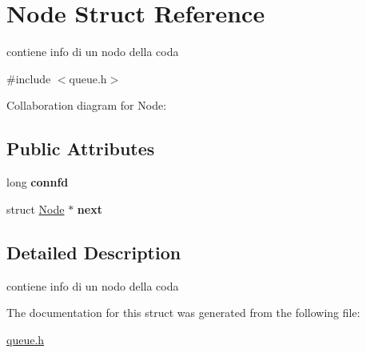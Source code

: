 \hypertarget{structNode}{}\section{Node Struct Reference}
\label{structNode}


contiene info di un nodo della coda  




{\ttfamily \#include $<$queue.\+h$>$}



Collaboration diagram for Node\+:
\subsection*{Public Attributes}
\begin{DoxyCompactItemize}
\item 
long {\bfseries connfd}\hypertarget{structNode_a0ac70851bfa37ea0470e52554bd2c16d}{}\label{structNode_a0ac70851bfa37ea0470e52554bd2c16d}

\item 
struct \hyperlink{structNode}{Node} $\ast$ {\bfseries next}\hypertarget{structNode_af67b110ca1a258b793bf69d306929b22}{}\label{structNode_af67b110ca1a258b793bf69d306929b22}

\end{DoxyCompactItemize}


\subsection{Detailed Description}
contiene info di un nodo della coda 

The documentation for this struct was generated from the following file\+:\begin{DoxyCompactItemize}
\item 
\hyperlink{queue_8h}{queue.\+h}\end{DoxyCompactItemize}
